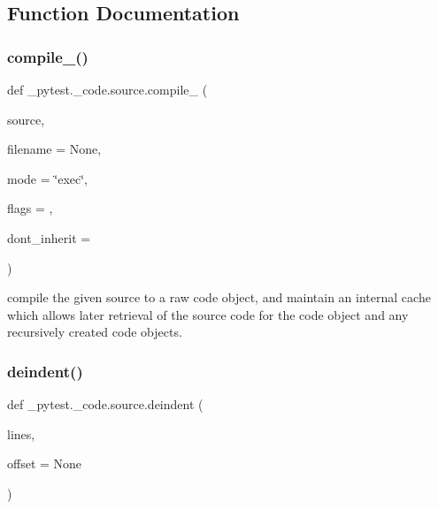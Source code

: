 \subsection{Function Documentation}
\mbox{\label{namespace__pytest_1_1__code_1_1source_a880c3f81c89810985d903019c632cce2}} 
\subsubsection{\texorpdfstring{compile\+\_\+()}{compile\_()}}
{\footnotesize\ttfamily def \+\_\+pytest.\+\_\+code.\+source.\+compile\+\_\+ (\begin{DoxyParamCaption}\item[{}]{source,  }\item[{}]{filename = {\ttfamily None},  }\item[{}]{mode = {\ttfamily \char`\"{}exec\char`\"{}},  }\item[{}]{flags = {},  }\item[{}]{dont\+\_\+inherit = {} }\end{DoxyParamCaption})}

\begin{DoxyVerb}compile the given source to a raw code object,
    and maintain an internal cache which allows later
    retrieval of the source code for the code object
    and any recursively created code objects.
\end{DoxyVerb}
 \mbox{\label{namespace__pytest_1_1__code_1_1source_a7a11c4b808daa88d8c1ec05f7e2e934f}} 
\subsubsection{\texorpdfstring{deindent()}{deindent()}}
{\footnotesize\ttfamily def \+\_\+pytest.\+\_\+code.\+source.\+deindent (\begin{DoxyParamCaption}\item[{}]{lines,  }\item[{}]{offset = {\ttfamily None} }\end{DoxyParamCaption})}

